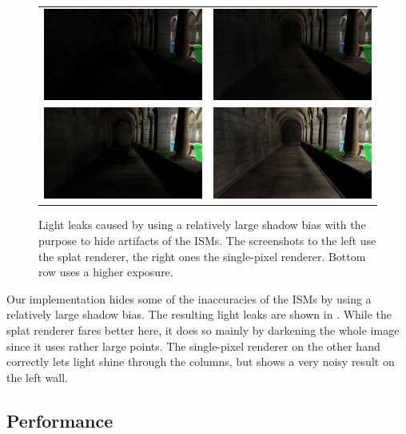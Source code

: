  \begin{figure}[htb]
 \centering
   \begin{tabular}{@{}cc@{}}
     \includegraphics[width=.22\textwidth]{../screenshots/bias_splat} &
     \includegraphics[width=.22\textwidth]{../screenshots/bias_single_pixel}\\
       \includegraphics[width=.22\textwidth]{../screenshots/bias_splat_exposure} &
       \includegraphics[width=.22\textwidth]{../screenshots/bias_single_pixel_exposure}
   \end{tabular}
   \caption{Light leaks caused by using a relatively large shadow bias with the purpose to hide artifacts of the ISMs. The screenshots to the left use the splat renderer, the right ones the single-pixel renderer. Bottom row uses a higher exposure.}
   \label{fig:results:bias}
 \end{figure}

 Our implementation hides some of the inaccuracies of the ISMs by using a relatively large shadow bias. The resulting light leaks are shown in . While the splat renderer fares better here, it does so mainly by darkening the whole image since it uses rather large points. The single-pixel renderer on the other hand correctly lets light shine through the columns, but shows a very noisy result on the left wall.




 \subsection{Performance}
 \label{sec:results:performance}
  \vspace{0.1em}


